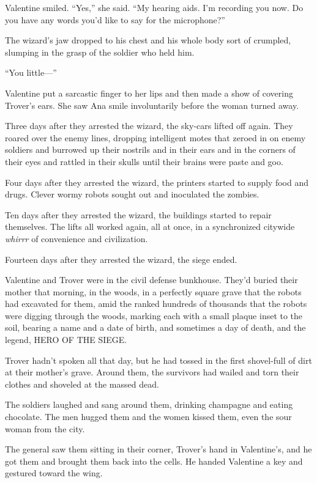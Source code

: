 Valentine smiled. “Yes,” she said. “My hearing aids. I’m recording
you now. Do you have any words you’d like to say for the
microphone?”

The wizard’s jaw dropped to his chest and his whole body sort of
crumpled, slumping in the grasp of the soldier who held him.

“You little---”

Valentine put a sarcastic finger to her lips and then made a show
of covering Trover’s ears. She saw Ana smile involuntarily before
the woman turned away.

\tb

Three days after they arrested the wizard, the sky-cars lifted off
again. They roared over the enemy lines, dropping intelligent motes
that zeroed in on enemy soldiers and burrowed up their nostrils and
in their ears and in the corners of their eyes and rattled in their
skulls until their brains were paste and goo.

Four days after they arrested the wizard, the printers started to
supply food and drugs. Clever wormy robots sought out and
inoculated the zombies.

Ten days after they arrested the wizard, the buildings started to
repair themselves. The lifts all worked again, all at once, in a
synchronized citywide \emph{whirrr} of convenience and
civilization.

Fourteen days after they arrested the wizard, the siege ended.

Valentine and Trover were in the civil defense bunkhouse. They’d
buried their mother that morning, in the woods, in a perfectly
square grave that the robots had excavated for them, amid the
ranked hundreds of thousands that the robots were digging through
the woods, marking each with a small plaque inset to the soil,
bearing a name and a date of birth, and sometimes a day of death,
and the legend, HERO OF THE SIEGE.

Trover hadn’t spoken all that day, but he had tossed in the first
shovel-full of dirt at their mother’s grave. Around them, the
survivors had wailed and torn their clothes and shoveled at the
massed dead.

The soldiers laughed and sang around them, drinking champagne and
eating chocolate. The men hugged them and the women kissed them,
even the sour woman from the city.

The general saw them sitting in their corner, Trover’s hand in
Va\-len\-tine’s, and he got them and brought them back into the cells.
He handed Valentine a key and gestured toward the wing.

